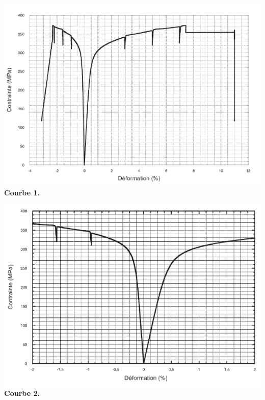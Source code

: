 \documentclass[lecture.tex]{subfiles}
\begin{document}
\begin{minipage}{0.5\textwidth}
    \begin{center}
      \includegraphics[width=\textwidth]{figB0018.png}
      \textbf{Courbe 1.}
    \end{center}
\end{minipage}
\begin{minipage}{0.5\textwidth}
    \begin{center}
      \includegraphics[width=\textwidth]{figC0018.png}
      \textbf{Courbe 2.}
    \end{center}
\end{minipage}
\end{document}
